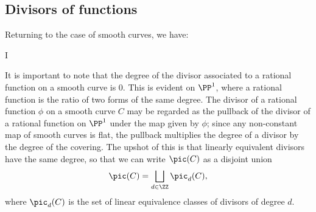%
%
%

\subsection{Divisors of functions}
Returning to the case of smooth curves, we have:
\begin{theorem}\label{degree defn}
I
\end{theorem}
It is important to note that the degree of the divisor associated to a rational function on a smooth curve is 0. This is evident on $\PP^1$, where a rational 
function is the ratio of two forms of the same degree. The divisor of a rational function $\phi$ on a smooth curve $C$ may be regarded as the pullback of the divisor of a rational function
on $\PP^1$ under the map given by $\phi$; since any non-constant map of smooth curves is flat, the pullback multiplies the degree of a divisor by the degree 
of the covering. The upshot of this is that linearly equivalent divisors have the same degree, so that we can write $\pic(C)$ as a disjoint union
$$
\pic(C) = \bigsqcup_{d \in \ZZ} \pic_d(C),
$$
where $\pic_d(C)$ is the set of linear equivalence classes of divisors of degree $d$.

